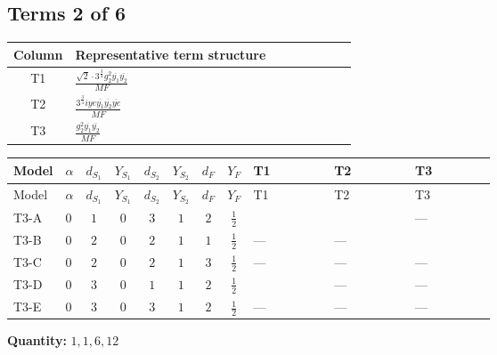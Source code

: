 \documentclass[8pt]{article}
\begin{document}
\begin{landscape}
\subsection*{Terms 2 of 6}
\begin{center}
\begin{tabular}{@{}c >{\raggedright\arraybackslash}p{0.82\linewidth}@{}}
\toprule
Column & Representative term structure \\
\midrule
T1 & \(\displaystyle \frac{\sqrt{2} \cdot 3^{\frac{3}{4}} g_{2}^{2} \overline{y_{1}} \overline{y_{2}}}{MF}\) \\
\midrule
T2 & \(\displaystyle \frac{3^{\frac{3}{4}} i ye \overline{y_{1}} \overline{y_{2}} \overline{ye}}{MF}\) \\
\midrule
T3 & \(\displaystyle \frac{g_{2}^{2} \overline{y_{1}} \overline{y_{2}}}{MF}\) \\
\midrule
\bottomrule
\end{tabular}
\end{center}
\smallskip
\tiny
\begin{longtable}{@{}llcccccc >{\raggedright\arraybackslash}p{0.21\linewidth} >{\raggedright\arraybackslash}p{0.21\linewidth} >{\raggedright\arraybackslash}p{0.21\linewidth}@{}}
\toprule
Model & $\alpha$ & $d_{S_1}$ & $Y_{S_1}$ & $d_{S_2}$ & $Y_{S_2}$ & $d_F$ & $Y_F$ & T1 & T2 & T3 \\
\midrule
\endfirsthead
\toprule
Model & $\alpha$ & $d_{S_1}$ & $Y_{S_1}$ & $d_{S_2}$ & $Y_{S_2}$ & $d_F$ & $Y_F$ & T1 & T2 & T3 \\
\midrule
\endhead
T3-A & $0$ & $1$ & $0$ & $3$ & $1$ & $2$ & $\frac{1}{2}$ & \scriptsize\adjustbox{max width=\linewidth}{$\begin{gathered} \frac{\sqrt{2} \cdot 3^{\frac{3}{4}} g_{2}^{2} \overline{y_{1}} \overline{y_{2}}}{3 MF}\end{gathered}$} & \scriptsize\adjustbox{max width=\linewidth}{$\begin{gathered} \frac{3^{\frac{3}{4}} i ye \overline{y_{1}} \overline{y_{2}} \overline{ye}}{12 MF}\end{gathered}$} & --- \\
\midrule
T3-B & $0$ & $2$ & $0$ & $2$ & $1$ & $1$ & $\frac{1}{2}$ & --- & --- & \scriptsize\adjustbox{max width=\linewidth}{$\begin{gathered} - \frac{3 g_{2}^{2} \overline{y_{1}} \overline{y_{2}}}{4 MF}\end{gathered}$} \\
\midrule
T3-C & $0$ & $2$ & $0$ & $2$ & $1$ & $3$ & $\frac{1}{2}$ & --- & --- & --- \\
\midrule
T3-D & $0$ & $3$ & $0$ & $1$ & $1$ & $2$ & $\frac{1}{2}$ & \scriptsize\adjustbox{max width=\linewidth}{$\begin{gathered} - \frac{\sqrt{2} \cdot 3^{\frac{3}{4}} g_{2}^{2} \overline{y_{1}} \overline{y_{2}}}{3 MF}\end{gathered}$} & --- & --- \\
\midrule
T3-E & $0$ & $3$ & $0$ & $3$ & $1$ & $2$ & $\frac{1}{2}$ & --- & --- & --- \\
\midrule
\bottomrule
\end{longtable}
\clearpage
\noindent\textbf{Quantity: }$\mathrm{1,1,6,12}$\par\smallskip

\end{landscape}
\end{document}
